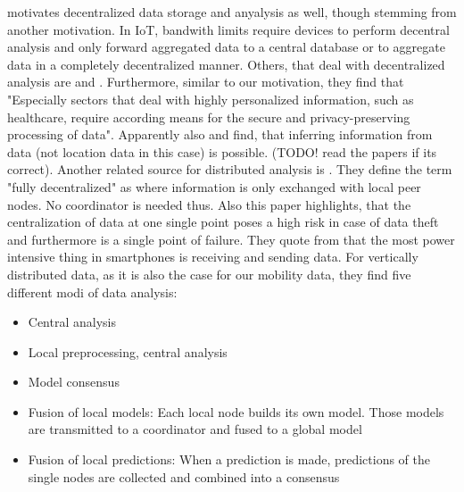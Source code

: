 \parencite{iot} motivates decentralized data storage and anyalysis as well, though stemming from another motivation. In IoT, bandwith limits require devices to perform decentral analysis and only forward aggregated data to a central database or to aggregate data in a completely decentralized manner. Others, that deal with decentralized analysis are \parencite{bin2010research} and \parencite{tsai2014data}. Furthermore, similar to our motivation, they find that "Especially sectors that deal with highly personalized information, such as healthcare, require according means for the secure and privacy-preserving processing of data". Apparently also \parencite{thrun2004advances} and \parencite{stolpe2011learning} find, that inferring information from data (not location data in this case) is possible. (TODO! read the papers if its correct). Another related source for distributed analysis is \parencite{das2010local}. They define the term "fully decentralized" as where information is only exchanged with local peer nodes. No coordinator is needed thus. Also this paper highlights, that the centralization of data at one single point poses a high risk in case of data theft and furthermore is a single point of failure. They quote from \parencite{carroll2010analysis} that the most power intensive thing in smartphones is receiving and sending data.
For vertically distributed data, as it is also the case for our mobility data, they find five different modi of data analysis:
\begin{itemize}
	\item Central analysis
	\item Local preprocessing, central analysis
	\item Model consensus
	\item Fusion of local models: Each local node builds its own model. Those models are transmitted to a coordinator and fused to a global model
	\item Fusion of local predictions: When a prediction is made, predictions of the single nodes are collected and combined into a consensus
\end{itemize}

